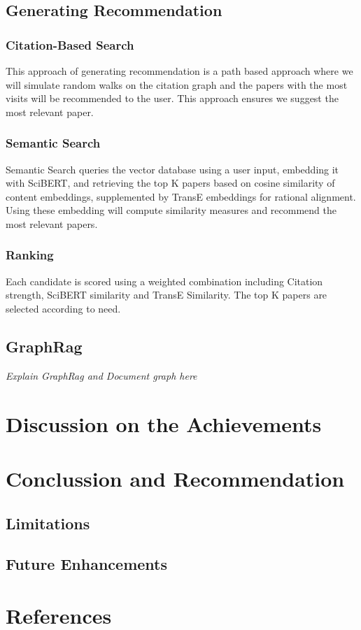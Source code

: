 \documentclass[a4paper,12pt]{article}
\begin{document}
\subsection{Generating Recommendation}
\subsubsection{Citation-Based Search}
This approach of generating recommendation is a path based approach where we will
simulate random walks on the citation graph and the papers with the most visits will
be recommended to the user. This approach ensures we suggest the most relevant paper.
\subsubsection{Semantic Search}
Semantic Search queries the vector database using a user input, embedding it with
SciBERT, and retrieving the top K papers based on cosine similarity of content
embeddings, supplemented by TransE embeddings for rational alignment. Using these
embedding will compute similarity measures and recommend the most relevant papers.
\subsubsection{Ranking}
Each candidate is scored using a weighted combination including Citation strength,
SciBERT similarity and TransE Similarity. The top K papers are selected according
to need.

\subsection{GraphRag}
\textit{Explain GraphRag and Document graph here}
\newpage

\section{Discussion on the Achievements}
\newpage

\section{Conclussion and Recommendation}
\subsection{Limitations}
\subsection{Future Enhancements}
\newpage

\section*{References}
\newpage
\end{document}
